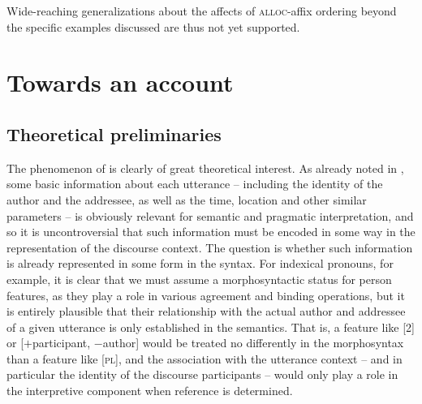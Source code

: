 \documentclass[output=paper, modfonts, nonflat]{langsci/langscibook}
\begin{document}
\ea\label{coffee}
  \z
\z
%
Wide-reaching generalizations about the affects of \textsc{alloc}-affix
ordering beyond the specific examples discussed are thus not yet
supported.

\section{Towards an account}
\label{sec:towards-an-account}

\subsection{Theoretical preliminaries}
\label{sec:theoprelim}

The phenomenon of \allagr{} is clearly of great theoretical
interest. As already noted in , some basic
information about each utterance -- including the identity of the
author and the addressee, as well as the time, location and other
similar parameters -- is obviously relevant for semantic and
pragmatic interpretation, and so it is uncontroversial that such
information must be encoded in some way in the representation of the
discourse context. The question is whether such information is already
represented in some form in the syntax. For indexical pronouns, for
example, it is clear that we must assume a morphosyntactic status for
person features, as they play a role in various agreement and binding
operations, but it is entirely plausible that their relationship with
the actual author and addressee of a given utterance is only
established in the semantics. That is, a feature like [2] or
[$+$participant, $-$author] would be treated no differently in the
morphosyntax than a feature like [\textsc{pl}], and the association with the
utterance context -- and in particular the identity of the discourse
participants -- would only play a role in the interpretive component
when reference is determined.
\end{document}
